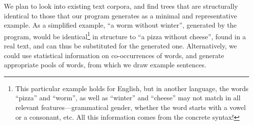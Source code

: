 We plan to look into existing text corpora, and find trees that are structurally identical  to those that our program generates as a minimal and representative example. As a simplified example, ``a worm without winter'', generated by the program, would be identical\footnote{This particular example holds for English, but in another language, the words ``pizza'' and ``worm'', as well as ``winter'' and ``cheese'' may not match in all relevant features---grammatical gender, whether the word starts with a vowel or a consonant, etc. All this information comes from the concrete syntax!}
 in structure to ``a pizza without cheese'', found in a real text, and can thus be substituted for the generated one.  
Alternatively, we could use statistical information on co-occurrences of words, and generate appropriate pools of words, from which we draw example sentences.